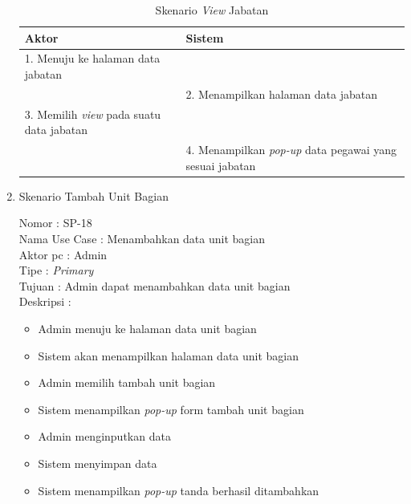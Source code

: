 \begin{enumerate}
\begin{itemize}
\end{itemize}

\begin{table}
	\caption{Skenario \textit{View} Jabatan}
	\centering
	\begin{tabular}{ | p{59mm} | p{69mm}|}
		\hline 
		\textbf{Aktor} & \textbf{Sistem} \\
		\hline
		
		1.	Menuju ke halaman data jabatan &  \\
		
		\hline
		
		&  2.	Menampilkan halaman data jabatan \\
		
		\hline
		
		3. Memilih \textit{view} pada suatu data jabatan & \\
		
		\hline
		
		& 4.	Menampilkan \textit{pop-up} data pegawai yang sesuai jabatan\\
		\hline
		
	\end{tabular}
\end{table}
\newpage

\item Skenario Tambah Unit Bagian

Nomor \kern 3.6pc : SP-18 \\
Nama Use Case : Menambahkan data unit bagian \\
Aktor  pc : Admin \\
Tipe \kern 4.6pc : \textit{Primary} \\
Tujuan \kern 3.6pc : Admin dapat menambahkan data unit bagian \\
Deskripsi \kern 2.5pc : 

\begin{itemize}
	\item Admin menuju ke halaman data unit bagian
	\item Sistem akan menampilkan halaman data unit bagian
	\item Admin memilih tambah unit bagian
	\item Sistem menampilkan \textit{pop-up} form tambah unit bagian
	\item Admin menginputkan data
	\item Sistem menyimpan data
	\item Sistem menampilkan \textit{pop-up} tanda berhasil ditambahkan
	
\end{itemize}


\end{enumerate}
